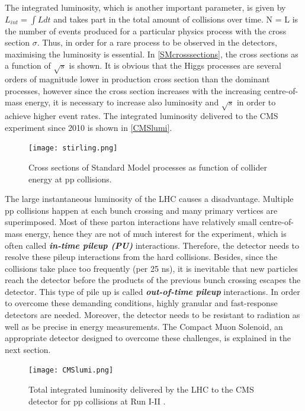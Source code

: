 The integrated luminosity, which is another important parameter, is given by \\ $L_{int} = \int L dt$ and takes part in the total amount of collisions over time.
\be
N = L \times \sigma
\ee
is the number of events produced for a particular physics process with the cross section $\sigma$. Thus, in order for a rare process to be observed in the detectors, maximising the luminosity is essential. In \autoref{SMcrosssections}, the cross sections as a function of $\sqrt{s}$ is shown. It is obvious that the Higgs processes are several orders of magnitude lower in production cross section than the dominant processes, however since the cross section increases with the increasing centre-of-mass energy, it is necessary to increase also luminosity and $\sqrt{s}$ in order to achieve higher event rates. The integrated luminosity delivered to the CMS experiment since 2010 is shown in \autoref{CMSlumi}.
\begin{figure}[ht]
	\centering
	\texttt{[image: stirling.png]}
	\vspace{2mm}
	\caption[Cross sections of Standard Model processes as function of collider energy at pp collisions.]
	{Cross sections of Standard Model processes as function of collider energy at pp collisions\cite{stirling}.}
	\label{SMcrosssections}
\end{figure}

The large instantaneous luminosity of the LHC causes a disadvantage. Multiple pp collisions happen at each bunch crossing and many primary vertices are superimposed. Most of these parton interactions have relatively small centre-of-mass energy, hence they are not of much interest for the experiment, which is often called \textbf{\emph{in-time pileup (PU)}} interactions. Therefore, the detector needs to resolve these pileup interactions from the hard collisions. Besides, since the collisions take place too frequently (per 25 ns), it is inevitable that new particles reach the detector before the products of the previous bunch crossing escapes the detector. This type of pile up is called \textbf{\emph{out-of-time pileup}} interactions. In order to overcome these demanding conditions, highly granular and fast-response detectors are needed. Moreover, the detector needs to be resistant to radiation as well as be precise in energy measurements. The Compact Muon Solenoid, an appropriate detector designed to overcome these challenges, is explained in the next section.

\begin{figure}[ht]
	\centering
	\texttt{[image: CMSlumi.png]}
	\vspace{2mm}
	\caption[Total integrated luminosity delivered by the LHC to the CMS detector for pp collisions at Run I-II.]
	{Total integrated luminosity delivered by the LHC to the CMS detector for pp collisions at Run I-II \cite{CMSlumi}.}
	\label{CMSlumi}
\end{figure}

